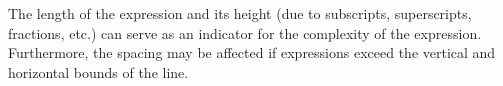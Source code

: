 


\noindent The length of the expression and its height (due to subscripts, superscripts, fractions, etc.) can serve as an indicator for the complexity of the expression.
Furthermore, the spacing may be affected if expressions exceed the vertical and horizontal bounds of the line.
